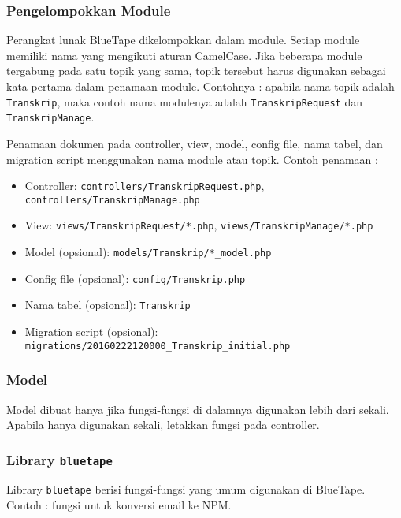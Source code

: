 \subsubsection{Pengelompokkan Module}
Perangkat lunak BlueTape dikelompokkan dalam module. Setiap module memiliki nama yang mengikuti aturan CamelCase. Jika beberapa module tergabung pada satu topik yang sama, topik tersebut harus digunakan sebagai kata pertama dalam penamaan module. Contohnya : apabila nama topik adalah \texttt{Transkrip}, maka contoh nama modulenya adalah \texttt{TranskripRequest} dan \texttt{TranskripManage}.

Penamaan dokumen pada controller, view, model, config file, nama tabel, dan migration script menggunakan nama module atau topik. Contoh penamaan :
\begin{itemize}
\item Controller: \texttt{controllers/TranskripRequest.php}, \texttt{controllers/TranskripManage.php}
\item View: \texttt{views/TranskripRequest/*.php}, \texttt{views/TranskripManage/*.php}
\item Model (opsional): \texttt{models/Transkrip/*\_model.php}
\item Config file (opsional): \texttt{config/Transkrip.php}
\item Nama tabel (opsional): \texttt{Transkrip}
\item Migration script (opsional): \texttt{migrations/20160222120000\_Transkrip\_initial.php}
\end{itemize} 

\subsubsection{Model}
Model dibuat hanya jika fungsi-fungsi di dalamnya digunakan lebih dari sekali. Apabila hanya digunakan sekali, letakkan fungsi pada controller.

\subsubsection{Library \texttt{bluetape}}
Library \texttt{bluetape} berisi fungsi-fungsi yang umum digunakan di BlueTape. Contoh : fungsi untuk konversi email ke NPM.


